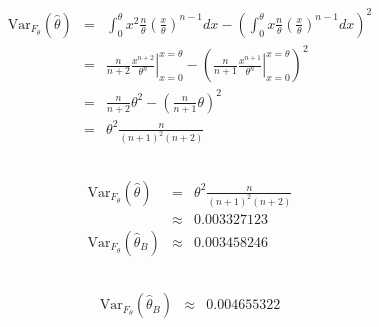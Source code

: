 \documentclass[11pt]{article}
\begin{document}
\subsection{}

\begin{eqnarray*}
  \textrm{Var}_{F_\theta}\left(\hat{\theta}\right)&=&\int_0^\theta x^2\frac{n}{\theta}\left(\frac{x}{\theta}\right)^{n-1}dx-\left(\int_0^\theta x\frac{n}{\theta}\left(\frac{x}{\theta}\right)^{n-1}dx\right)^2\\
                                                  &=&\left.\frac{n}{n+2}\frac{x^{n+2}}{\theta^n}\right|_{x=0}^{x=\theta}-\left(\left.\frac{n}{n+1}\frac{x^{n+1}}{\theta^n}\right|_{x=0}^{x=\theta}\right)^2\\
                                                  &=&\frac{n}{n+2}\theta^2-\left(\frac{n}{n+1}\theta\right)^2\\
                                                  &=&\theta^2\frac{n}{\left(n+1\right)^2\left(n+2\right)}
\end{eqnarray*}

\subsection{}

\begin{eqnarray*}
  \textrm{Var}_{F_\theta}\left(\hat{\theta}\right)&=&\theta^2\frac{n}{\left(n+1\right)^2\left(n+2\right)}\\
                                                  &\approx&0.003327123\\
  \textrm{Var}_{F_\theta}\left(\hat{\theta}_B\right)&\approx&0.003458246
\end{eqnarray*}

\subsection{}

\begin{eqnarray*}
  \textrm{Var}_{F_\theta}\left(\hat{\theta}_B\right)&\approx&0.004655322
\end{eqnarray*}

\subsection{}
\end{document}
